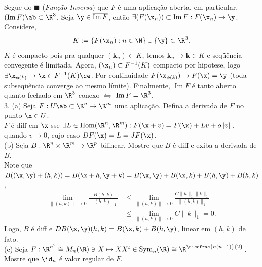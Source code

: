\textcolor{gris}{
Segue do \(\blacksquare\) (\emph{Função Inversa}) que \(F\) é uma aplicação aberta, em particular, \((\operatorname{Im}F)\ab \subset \R^3\). Seja \(\y \in \overline{\operatorname{Im}F}\), então \(\exists (F(\x_n)) \subset \operatorname{Im}F : F(\x_n) \to \y \). Considere,
\[K := \{F(\x_n): n \in \N\} \cup \{\y\}\subset \R^3.\] \(K\) é compacto pois pra qualquer \((\textbf{k}_n)\subset K\), temos \(\textbf{k}_n \to \textbf{k} \in K\) e seqüência convegente é limitada. Agora, \((\x_n) \subset F^{-1}(K)\) compacto por hipotese, logo \(\exists \x_{\phi(k)} \to \x \in F^{-1}(K)\ce\). Por continuidade \(F(\x_{\phi(k)}) \to F(\x) = \y\) (toda subseqüência converge ao mesmo límite). Finalmente, \(\operatorname{Im}F\) é tanto aberto quanto fechado em \(\R^3\) conexo \(\leftrightharpoons\) \(\operatorname{Im}F = \R^3\). \vspace{-0.1cm}\\ } 
\hspace{-0.2cm}3. (a) Seja \(F: U\ab \subset \R^n \to \R^m\) uma aplicação. Defina a derivada de \(F\) no punto \(\x\in U\).  \\ 
\textcolor{gris}{\(F \) é diff em \(\x\) sse \(\exists L \in \hom(\R^n, \R^m) : F(\x+v) = F(\x) + Lv + o\|v\|\), quando \(v\to 0\), cujo caso \(DF(\x) = L = JF(\x)\). } \vspace{-0.1cm} \\ 
\hspace{-0.1cm}(b) Seja \(B :\R^n \times \R^m \to \R^p\) bilinear. Mostre que \(B\) é diff e exiba a derivada de \(B\).  \\ 
\textcolor{gris}{Note que \(B((\x,\y) +(h,k))= B(\x + h, \y +k) = B(\x,\y) + B(\x, k) + B(h, \y) + B(h,k)\),
\begin{align*}
\lim_{\|(h,k)\| \to 0} \frac{B(h,k)}{\|(h,k)\|_1} &\leq \lim_{\|(h,k)\| \to 0} \frac{C\|h\|_1\|k\|_1}{\|(h,k)\|_1}\\ 
&\leq \lim_{\|(h,k)\| \to 0} C\|k\|_1 = 0.  
\end{align*} 
Logo, \(B\) é diff e \(DB(\x,\y)(h,k) = B(\x, k) + B(h,\y)\), linear em \((h,k)\) de fato. }  \vspace{0.3cm}\\ 
(c) Seja \(F : \R^{n^2}\cong M_n(\R) \ni X \mapsto XX^t \in \operatorname{Sym}_n(\R) \cong \R^{\nicefrac{n(n+1)}{2}}\). Mostre que \(\id_n\) é valor regular de \(F\). 
